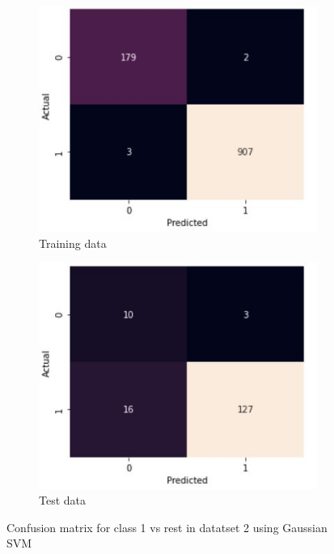 \documentclass[11pt]{article}
\begin{document}
\begin{figure}[h]
\centering
	\begin{subfigure}[b]{0.45\textwidth}
	\centering
	\includegraphics[scale=0.5]{dataset2_gauss_1_cm_train.jpg}
	\caption{Training data}
	\label{fig:fig3.2.2.1}
	\end{subfigure}
	\begin{subfigure}[b]{0.45\textwidth}
	\centering
	\includegraphics[scale=0.5]{dataset2_gauss_1_cm_test.jpg}
	\caption{Test data}
	\label{fig:fig3.2.2.2}
	\end{subfigure}
\caption{Confusion matrix for class 1 vs rest in datatset 2 using Gaussian SVM}
\label{fig:fig3.2.2}
\end{figure}
\end{document}
